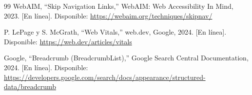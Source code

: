 \documentclass[conference]{IEEEtran}
\begin{document}
\begin{thebibliography}{99}
WebAIM, ``Skip Navigation Links,'' WebAIM: Web Accessibility In Mind, 2023. [En línea]. Disponible: \url{https://webaim.org/techniques/skipnav/}

P. LePage y S. McGrath, ``Web Vitals,'' web.dev, Google, 2024. [En línea]. Disponible: \url{https://web.dev/articles/vitals}

Google, ``Breadcrumb (BreadcrumbList),'' Google Search Central Documentation, 2024. [En línea]. Disponible: \url{https://developers.google.com/search/docs/appearance/structured-data/breadcrumb}

\end{thebibliography}
\end{document}
